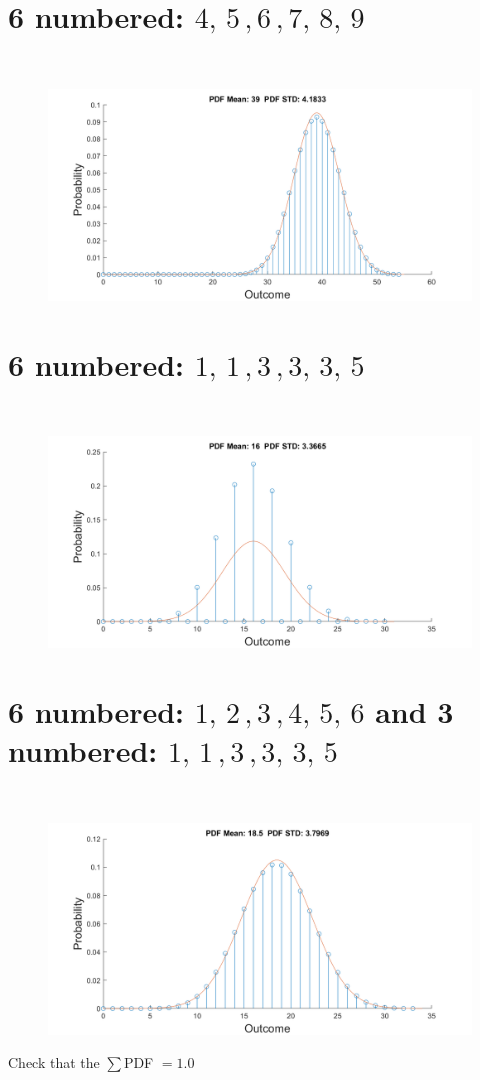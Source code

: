 \documentclass[12pt,letterpaper, onecolumn]{exam}
\begin{document}
\begin{questions}
\begin{parts}
		\part{6 numbered: $4,\,5\,,6\,,7,\,8,\,9$}\\
		\solution
		\begin{figure}[!h]
			\centering
			\includegraphics[width=.91\linewidth]{Q1_b.png}
		\end{figure}
		\part{6 numbered: $1,\,1\,,3\,,3,\,3,\,5$}\\
		\solution
		\begin{figure}[!h]
			\centering
			\includegraphics[width=.91\linewidth]{Q1_c.png}
		\end{figure}
		\clearpage
		\part{6 numbered: $1,\,2\,,3\,,4,\,5,\,6$ and 3 numbered: $1,\,1\,,3\,,3,\,3,\,5$}\\
		\solution
		\begin{figure}[!h]
			\centering
			\includegraphics[width=.91\linewidth]{Q1_d.png}
		\end{figure}
	\end{parts}
	Check that the $\sum$PDF $= 1.0$


\end{questions}
\end{document}
